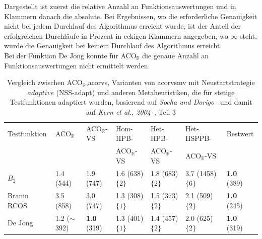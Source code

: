 \documentclass[fontsize=12, a4aper]{scrartcl}
\begin{document}
\begin{table}[H]
		\smallskip
		
		Dargestellt ist zuerst die relative Anzahl an Funktionsauswertungen und in Klammern danach die absolute. Bei Ergebnissen, wo die erforderliche Genauigkeit nicht bei jedem Durchlauf des Algorithmus erreicht wurde, ist der Anteil der erfolgreichen Durchläufe in Prozent in eckigen Klammern angegeben, wo \(\infty\) steht, wurde die Genauigkeit bei keinem Durchlauf des Algorithmus erreicht.\\
		Bei der Funktion \glqq De Jong\grqq{} konnte für ACO\(_{\mathbb{R}}\) die genaue Anzahl an Funktionsauswertungen nicht ermittelt werden.\hfill\newline
		
	\end{table}
	
	\begin{table}[H]
		
		\caption{Vergleich zwischen ACO\(_{\mathbb{R}}\),\acl{acorvs}, Varianten von \acl{acorvsmv} mit Neustartstrategie \(adaptive\) (NSS-adapt) und anderen Metaheuristiken, die für stetige Testfunktionen adaptiert wurden, basierend auf \textit{Socha und Dorigo}~\cite{socha2008ant} und damit auf \textit{Kern et al., 2004}~\cite{kern2004learning}, Teil 3}
		
		\label{subsec:Vergleich_Von_ACO_R_ACO_R_Very_Simple_Und_Iterationen:tab:Vergleich_Mit_Meta_-_Heuristiken_Adaptiert_Fuer_Stetige_Probleme_Teil_3}
		
		\scriptsize
		
		\begin{tabularx}{\linewidth}{ l X X X X X X}
			
			\toprule
			
			Testfunktion & ACO\(_{\mathbb{R}}\) & ACO\(_{\mathbb{R}}\)-VS & Hom-HPB- & Het-HPB- & Het-HSPPB- & Bestwert\\
			& & & ACO\(_\mathbb{R}\)-VS & ACO\(_\mathbb{R}\)-VS & ACO\(_\mathbb{R}\)-VS & \\
			
			\midrule
			
			\(B_2\) &  1.4 (544) & 1.9 (747) & 1.6 (638) \(\{2\}\) & 1.8 (683) \(\{2\}\) & 3.7 (1458) \(\{6\}\) & \textbf{1.0} (389)\\
			
			Branin RCOS & 3.5 (858) & 3.0 (747) & 1.3 (308) \(\{1\}\) & 1.5 (373) \(\{2\}\) & 2.1 (509) \(\{2\}\) & \textbf{1.0} (245)\\
			
			De Jong & 1.2 (\(\sim\)392) & \textbf{1.0} (319) & 1.3 (401) \(\{1\}\) & 1.4 (457) \(\{2\}\) & 2.0 (625) \(\{2\}\) & \textbf{1.0} (319)\\
			

\end{tabularx}
\end{table}
\end{document}
